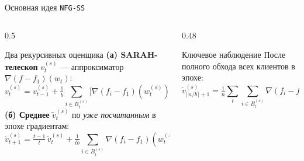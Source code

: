 \documentclass[10pt,aspectratio=169,t]{beamer}
\newcommand{\nablaf}[1]{\nabla(f - f_1)(#1)}
\newcommand{\nablafi}[1]{\nabla(f_i - f_1)(#1)}
\begin{document}
\begin{frame}{Основная идея \texttt{NFG-SS}}
\begin{columns}[T,onlytextwidth]
\begin{column}{0.5\textwidth}
\begin{block}{Два рекурсивных оценщика}
\textbf{(а) SARAH-телескоп} $v_t^{(s)}$ — аппроксиматор $\nablaf{w_t}$:
\[
v_t^{(s)} = v_{t-1}^{(s)} + \tfrac{1}{b}\!\!\sum_{i\in B_t^{(s)}}\!\!\bigl[\nablafi{w_t^{(s)}} - \nablafi{w_{t-1}^{(s)}}\bigr].
\]
\textbf{(б) Среднее} $\tilde v_t^{(s)}$ по \emph{уже посчитанным} в эпохе градиентам:
\[
\tilde v_{t+1}^{(s)} = \tfrac{t-1}{t}\,\tilde v_t^{(s)} + \tfrac{1}{tb}\!\!\sum_{i\in B_t^{(s)}}\!\!\nablafi{w_t^{(s)}}.
\]
\end{block}
\end{column}

\begin{column}{0.48\textwidth}
\begin{block}{Ключевое наблюдение}
После полного обхода всех клиентов в эпохе:
\[
\tilde v_{\lceil n/b\rceil+1}^{(s)} = \tfrac{1}{n}\!\sum_{t}\!\sum_{i\in B_t^{(s)}}\!\!\nablafi{w_t^{(s)}}.
\]
\end{block}

\end{column}
\end{columns}
\end{frame}
\end{document}
